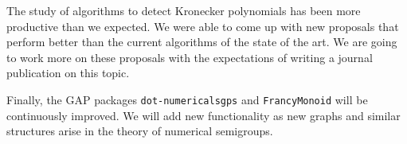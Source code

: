 The study of algorithms to detect Kronecker polynomials has been more productive than we expected. We were able to come up with new proposals that perform better than the current algorithms of the state of the art. We are going to work more on these proposals with the expectations of writing a journal publication on this topic.

Finally, the GAP packages \texttt{dot-numericalsgps} and \texttt{FrancyMonoid} will be continuously improved. We will add new functionality as new graphs and similar structures arise in the theory of numerical semigroups.
